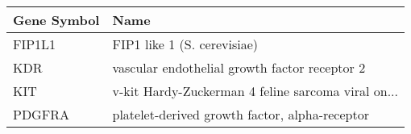 \begin{tabular}{ll}
\toprule
Gene Symbol &                                               Name \\
\midrule
     FIP1L1 &                        FIP1 like 1 (S. cerevisiae) \\
        KDR &      vascular endothelial growth factor receptor 2 \\
        KIT & v-kit Hardy-Zuckerman 4 feline sarcoma viral on... \\
     PDGFRA &     platelet-derived growth factor, alpha-receptor \\
\bottomrule
\end{tabular}
